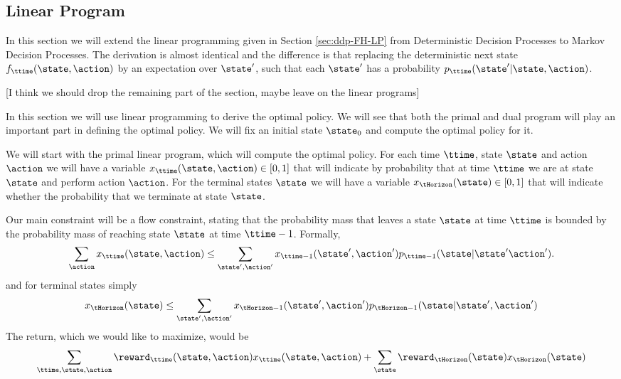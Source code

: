 \begin{leftbar}
\section{Linear Program}
\label{C-MDP-FH:sec:LP}




In this section we will extend the linear programming given in
Section \ref{sec:ddp-FH-LP} from Deterministic Decision Processes to
Markov Decision Processes. The derivation is almost identical and
the difference is that replacing the deterministic next state
$f_\ttime(\state,\action)$ by an expectation over $\state'$, such
that each $\state'$ has a probability
$p_\ttime(\state'|\state,\action)$.

[I think we should drop the remaining part of the section, maybe
leave on the linear programs]


In this section we will use linear programming to derive the optimal
policy.
%
We will see that both the primal and dual program will play
an important part in defining the optimal policy. We will fix an
initial state $\state_0$ and compute the optimal policy for it.

We will start with the primal linear program, which will compute the
optimal policy. For each time $\ttime$, state $\state$ and action
$\action$ we will have a variable
$x_{\ttime}(\state,\action)\in[0,1]$ that will indicate by
probability that at time $\ttime$ we are at state $\state$ and
perform action $\action$. For the terminal states $\state$ we will
have a variable $x_{\tHorizon}(\state)\in[0,1]$ that will indicate
whether the probability that we terminate at state $\state$.

Our main constraint will be a flow constraint, stating that the
probability mass that leaves a state $\state$ at time $\ttime$ is
bounded by the probability mass of reaching state $\state$ at time
$\ttime-1$.
%
Formally,
\[
\sum_{\action} x_{\ttime}(\state,\action)\leq
\sum_{\state',\action'}
x_{\ttime-1}(\state',\action')p_{\ttime-1}(\state|\state'\action').
\]
and for terminal states simply
\[
x_{\tHorizon}(\state)\leq\sum_{\state',\action'}
x_{\tHorizon-1}(\state',\action')p_{\tHorizon-1}(\state|\state',\action')
\]
The return, which we would like to maximize, would be
\[
\sum_{\ttime,\state,\action}
\reward_{\ttime}(\state,\action)x_{\ttime}(\state,\action)+\sum_{\state}\reward_{\tHorizon}(\state)x_{\tHorizon}(\state)
\]


\end{leftbar}
